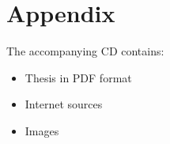 \appendix

\chapter{Appendix}

The accompanying CD contains:
\begin{itemize}
	\item Thesis in PDF format
    \item Internet sources
    \item Images
\end{itemize}
